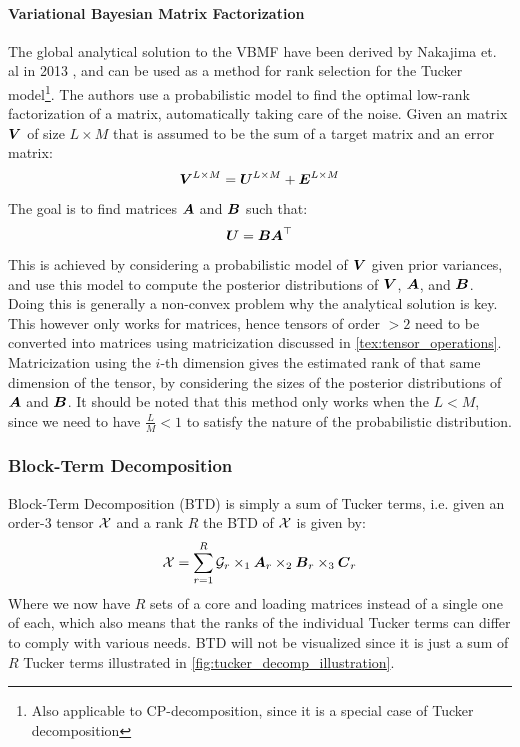 \paragraph{Variational Bayesian Matrix Factorization} \label{tex:VBMF}
The global analytical solution to the VBMF have been derived by Nakajima et. al in 2013 \cite{Nakajima2013}, and can be used as a method for rank selection for the Tucker model\footnote{Also applicable to CP-decomposition, since it is a special case of Tucker decomposition}. The authors use a probabilistic model to find the optimal low-rank factorization of a matrix, automatically taking care of the noise. Given an matrix $\boldsymbol{V}$ of size $L\times M$ that is assumed to be the sum of a target matrix and an error matrix:
\begin{equation}
    \boldsymbol{V}^{L\times M} = \boldsymbol{U}^{L\times M} + \boldsymbol{E}^{L\times M}
\end{equation}
The goal is to find matrices $\boldsymbol{A}$ and $\boldsymbol{B}$ such that:
\begin{equation}
    \boldsymbol{U} = \boldsymbol{B}\boldsymbol{A}^{\top}
\end{equation}
This is achieved by considering a probabilistic model of $\boldsymbol{V}$ given prior variances, and use this model to compute the posterior distributions of $\boldsymbol{V}$, $\boldsymbol{A}$, and $\boldsymbol{B}$. Doing this is generally a non-convex problem why the analytical solution is key. This however only works for matrices, hence tensors of order $> 2$ need to be converted into matrices using matricization discussed in \autoref{tex:tensor_operations}. Matricization using the $i$-th dimension gives the estimated rank of that same dimension of the tensor, by considering the sizes of the posterior distributions of $\boldsymbol{A}$ and $\boldsymbol{B}$. It should be noted that this method only works when the $L < M$, since we need to have $\frac{L}{M} < 1$ to satisfy the nature of the probabilistic distribution.

\subsubsection{Block-Term Decomposition}
Block-Term Decomposition (BTD) is simply a sum of Tucker terms, i.e. given an order-3 tensor $\mathcal{X}$ and a rank $R$ the BTD of $\mathcal{X}$ is given by:
\begin{equation}
    \mathcal{X} = \sum_{r=1}^R \mathcal{G}_r \times_1 \boldsymbol{A}_r \times_2 \boldsymbol{B}_r \times_3 \boldsymbol{C}_r
\end{equation}
Where we now have $R$ sets of a core and loading matrices instead of a single one of each, which also means that the ranks of the individual Tucker terms can differ to comply with various needs. BTD will not be visualized since it is just a sum of $R$ Tucker terms illustrated in \autoref{fig:tucker_decomp_illustration}.


